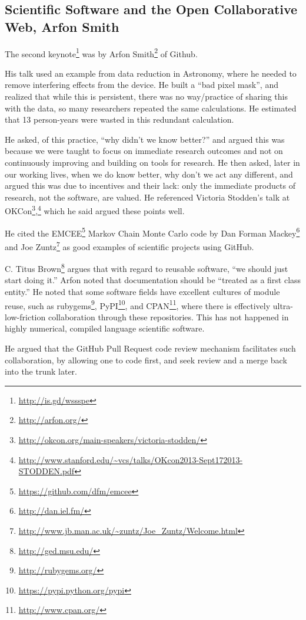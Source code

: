 \documentclass[11pt, oneside]{amsart}
\begin{document}
\subsection{Scientific Software and the Open Collaborative Web, Arfon Smith}


The second keynote\footnote{\url{http://is.gd/wssspe}} was by
 Arfon Smith\footnote{\url{http://arfon.org/}} of Github.

His talk used an example from data reduction in Astronomy, where he
needed to remove interfering effects from the device. He built a ``bad
pixel mask'', and realized that while this is persistent, there was no
way/practice of sharing this with the data, so many researchers
repeated the same calculations. He estimated that 13 person-years were
wasted in this redundant calculation.

He asked, of this practice, ``why didn't we know better?'' and argued
this was because we were taught to focus on immediate research
outcomes and not on continuously improving and building on tools for
research. He then asked, later in our working lives, when we do know
better, why don't we act any different, and argued this was due to
incentives and their lack: only the immediate products of research,
not the software, are valued.  He referenced Victoria Stodden's talk
at
OKCon\footnote{\url{http://okcon.org/main-speakers/victoria-stodden/}},\footnote{\url{http://www.stanford.edu/~vcs/talks/OKcon2013-Sept172013-STODDEN.pdf}}
which he said argued these points well.

He cited the EMCEE\footnote{\url{https://github.com/dfm/emcee}} Markov
Chain Monte Carlo code by Dan Forman
Mackey\footnote{\url{http://dan.iel.fm/}} and Joe
Zuntz\footnote{\url{http://www.jb.man.ac.uk/~zuntz/Joe_Zuntz/Welcome.html}}
as good examples of scientific projects using GitHub.

C. Titus Brown\footnote{\url{http://ged.msu.edu/}} argues that with
regard to reusable software, ``we should just start doing it.'' Arfon
noted that documentation should be ``treated as a first class
entity.''  He noted that some software fields have excellent cultures
of module reuse, such as
rubygems\footnote{\url{http://rubygems.org/}},
PyPI\footnote{\url{https://pypi.python.org/pypi}}, and
CPAN\footnote{\url{http://www.cpan.org/}}, where there is effectively
ultra-low-friction collaboration through these repositories. This has
not happened in highly numerical, compiled language scientific
software.

He argued that the GitHub Pull Request code review mechanism facilitates
such collaboration, by allowing one to code first, and seek review and a
merge back into the trunk later.
\end{document}
